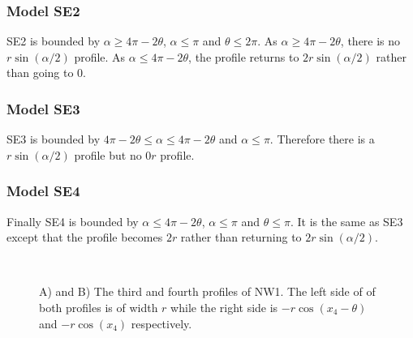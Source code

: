 \subsubsection{Model SE2} \label{SE2}

SE2 is bounded by $\alpha \ge 4\pi - 2\theta$, $\alpha \le \pi$ and $\theta \le 2\pi$. As $\alpha \ge 4\pi - 2\theta$, there is no $r\sin(\alpha/2)$ profile. As $\alpha \le 4\pi - 2\theta$, the profile returns to $2r\sin(\alpha/2)$ rather than going to 0.



\subsubsection{Model SE3} \label{SE3}

SE3 is bounded by $4\pi - 2\theta \le \alpha \le 4\pi - 2\theta$ and $\alpha \le \pi$. Therefore there is a $r\sin(\alpha/2)$ profile but no $0r$ profile.



\subsubsection{Model SE4} \label{SE4}

Finally SE4 is bounded by  $\alpha \le 4\pi - 2\theta $, $\alpha\le\pi$ and $\theta \le \pi$. It is the same as SE3 except that the profile becomes $2r$ rather than returning to $2r\sin(\alpha/2)$.




\begin{figure}[t]
        \centering
        \begin{subfigure}[t]{0.3\textwidth}
                \centering
                \caption{}
                \label{f:NW1AT}
        \end{subfigure}
~ 
        \begin{subfigure}[t]{0.3\textwidth}
                \centering
                \caption{}
                \label{f:NW1behindFull}
        \end{subfigure}
\caption{A) and B) The third and fourth profiles of NW1. The left side of of both profiles is of width $r$ while the right side is $- r\cos(x_4 - \theta)$ and $- r\cos(x_4)$ respectively. }
\label{f:NW1}
\end{figure}

